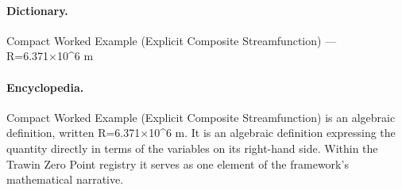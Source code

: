 \paragraph{Dictionary.}
Compact Worked Example (Explicit Composite Streamfunction) — R=6.371×10\textasciicircum{}6 m

\paragraph{Encyclopedia.}
Compact Worked Example (Explicit Composite Streamfunction) is an algebraic definition, written R=6.371×10\textasciicircum{}6 m. It is an algebraic definition expressing the quantity directly in terms of the variables on its right-hand side. Within the Trawin Zero Point registry it serves as one element of the framework's mathematical narrative.
